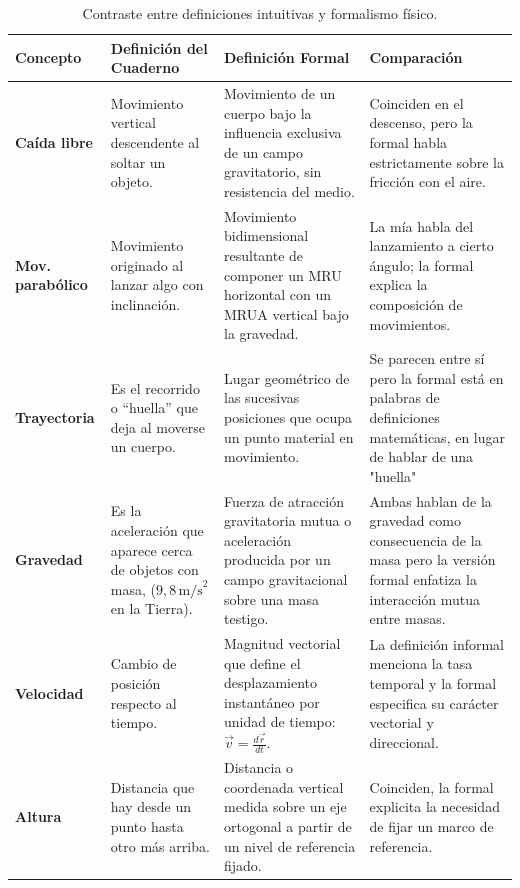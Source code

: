 \documentclass[11pt,a4paper]{article}
\begin{document}
	\begin{table}[H]
		\centering
		\small
		\begin{tabularx}{\textwidth}{l p{3.8cm} p{4.2cm} X}
			\toprule
			\textbf{Concepto} & \textbf{Definición del Cuaderno} & \textbf{Definición Formal} & \textbf{Comparación} \\
			\midrule
			\textbf{Caída libre} & Movimiento vertical descendente al soltar un objeto. & Movimiento de un cuerpo bajo la influencia exclusiva de un campo gravitatorio, sin resistencia del medio. & Coinciden en el descenso, pero la formal habla estrictamente sobre la fricción con el aire. \\
			\addlinespace
			\textbf{Mov. parabólico} & Movimiento originado al lanzar algo con inclinación. & Movimiento bidimensional resultante de componer un MRU horizontal con un MRUA vertical bajo la gravedad. & La mía habla del lanzamiento a cierto ángulo; la formal explica la composición de movimientos. \\
			\addlinespace
			\textbf{Trayectoria} & Es el recorrido o ``huella'' que deja al moverse un cuerpo. & Lugar geométrico de las sucesivas posiciones que ocupa un punto material en movimiento. & Se parecen entre sí pero la formal está en palabras de definiciones matemáticas, en lugar de hablar de una "huella" \\
			\addlinespace
			\textbf{Gravedad} & Es la aceleración que aparece cerca de objetos con masa, ($9{,}8\,\text{m/s}^2$ en la Tierra). & Fuerza de atracción gravitatoria mutua o aceleración producida por un campo gravitacional sobre una masa testigo. & Ambas hablan de la gravedad como consecuencia de la masa pero la versión formal enfatiza la interacción mutua entre masas. \\
			\addlinespace
			\textbf{Velocidad} & Cambio de posición respecto al tiempo. & Magnitud vectorial que define el desplazamiento instantáneo por unidad de tiempo: $\vec{v} = \frac{d\vec{r}}{dt}$. & La definición informal menciona la tasa temporal y la formal especifica su carácter vectorial y direccional. \\
			\addlinespace
			\textbf{Altura} & Distancia que hay desde un punto hasta otro más arriba. & Distancia o coordenada vertical medida sobre un eje ortogonal a partir de un nivel de referencia fijado. & Coinciden, la formal explicita la necesidad de fijar un marco de referencia. \\
			\bottomrule
		\end{tabularx}
		\caption{Contraste entre definiciones intuitivas y formalismo físico.}
		\label{tab:comparacion_conceptos}
	\end{table}
	
\end{document}
